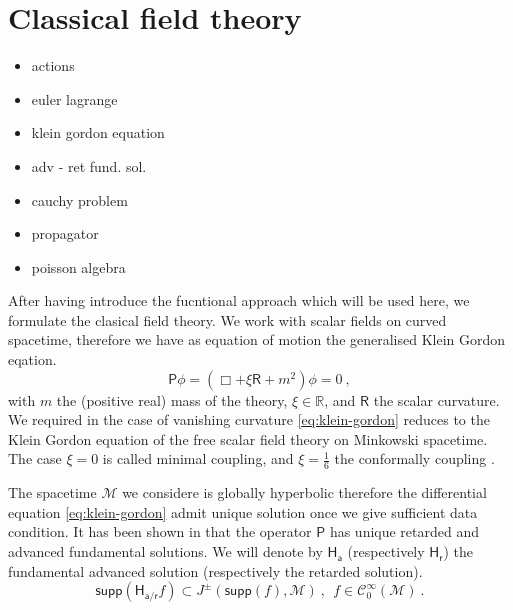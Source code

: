 \documentclass[11pt]{book}
\newcommand{\supp}{\mathsf{supp}}
\newcommand{\Ccal}{\mathcal{C}}
\newcommand{\Mcal}{\mathcal{M}}
\newcommand{\Rbb}{\mathbb{R}}
\newcommand{\Hsf}{\mathsf{H}}
\newcommand{\Psf}{\mathsf{P}}
\newcommand{\Rsf}{\mathsf{R}}
\newcommand{\asf}{\mathsf{a}}
\newcommand{\rsf}{\mathsf{r}}
\theoremstyle{break}
\begin{document}
\section{Classical field theory}

\begin{itemize}
\item actions
\item euler lagrange
\item klein gordon equation
\item adv - ret fund. sol.
\item cauchy problem
\item propagator
\item poisson algebra
\end{itemize}

\vspace*{88pt}


After having introduce the fucntional approach which will be used here, we formulate the clasical field theory. We work with scalar fields on curved spacetime, therefore we have as equation of motion the generalised Klein Gordon eqation.%
%
\begin{equation}
\Psf \phi = \left( \Box + \xi \Rsf + m^2 \right) \phi = 0 \ , 
\label{eq:klein-gordon}
\end{equation}
%
with $m$ the (positive real) mass of the theory, $\xi \in \Rbb$, and $\Rsf$ the scalar curvature. We required in the case of vanishing curvature \eqref{eq:klein-gordon} reduces to the Klein Gordon equation of the free scalar field theory on Minkowski spacetime. The case $\xi=0$ is called minimal coupling, and $\xi=\frac16$ the conformally coupling \cite[Appendix D]{waldGR}.\par%


\bigskip


The spacetime $\Mcal$ we considere is globally hyperbolic therefore the differential equation \eqref{eq:klein-gordon} admit unique solution once we give sufficient data condition. It has been shown in \cite[section 3]{Bar:2007zz} that the operator $\Psf$ has unique retarded and advanced fundamental solutions. We will denote by $\Hsf_\asf$ (respectively $\Hsf_\rsf$) the fundamental advanced solution (respectively the retarded solution). 
%
\begin{equation*}
\supp\left( \Hsf_{\asf/\rsf} f \right) \subset J^{\pm}\left(\supp\left(f\right),\Mcal\right) \ , \ \ f \in \Ccal^\infty_0(\Mcal) \ . 
\end{equation*}
%
\end{document}

